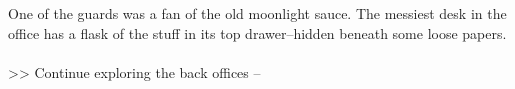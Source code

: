 One of the guards was a fan of the old moonlight sauce. The messiest desk in the office has a flask of the stuff in its top drawer--hidden beneath some loose papers.\\
\\

>> Continue exploring the back offices -- 